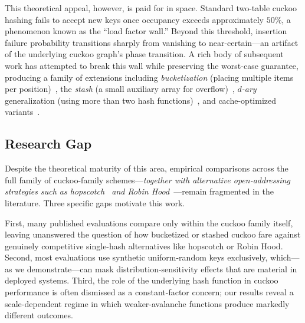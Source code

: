 \documentclass[10pt,journal,compsoc]{IEEEtran}
\begin{document}
This theoretical appeal, however, is paid for in space. Standard two-table cuckoo hashing fails to accept new keys once occupancy exceeds approximately $50\%$, a phenomenon known as the ``load factor wall.'' Beyond this threshold, insertion failure probability transitions sharply from vanishing to near-certain---an artifact of the underlying cuckoo graph's phase transition. A rich body of subsequent work has attempted to break this wall while preserving the worst-case guarantee, producing a family of extensions including \emph{bucketization} (placing multiple items per position)~\cite{erlingsson2006cool,fan2013memc3}, the \emph{stash} (a small auxiliary array for overflow)~\cite{kirsch2009stash}, \emph{$d$-ary} generalization (using more than two hash functions)~\cite{fotakis2005dary,bell2024dary}, and cache-optimized variants~\cite{lescouarnec2018cuckoopp,li2014libcuckoo}.

\subsection{Research Gap}
Despite the theoretical maturity of this area, empirical comparisons across the full family of cuckoo-family schemes---\emph{together with alternative open-addressing strategies such as hopscotch~\cite{herlihy2008hopscotch} and Robin Hood~\cite{celis1985robinhood}}---remain fragmented in the literature. Three specific gaps motivate this work.

First, many published evaluations compare only within the cuckoo family itself, leaving unanswered the question of how bucketized or stashed cuckoo fare against genuinely competitive single-hash alternatives like hopscotch or Robin Hood. Second, most evaluations use synthetic uniform-random keys exclusively, which---as we demonstrate---can mask distribution-sensitivity effects that are material in deployed systems. Third, the role of the underlying hash function in cuckoo performance is often dismissed as a constant-factor concern; our results reveal a scale-dependent regime in which weaker-avalanche functions produce markedly different outcomes.
\end{document}
